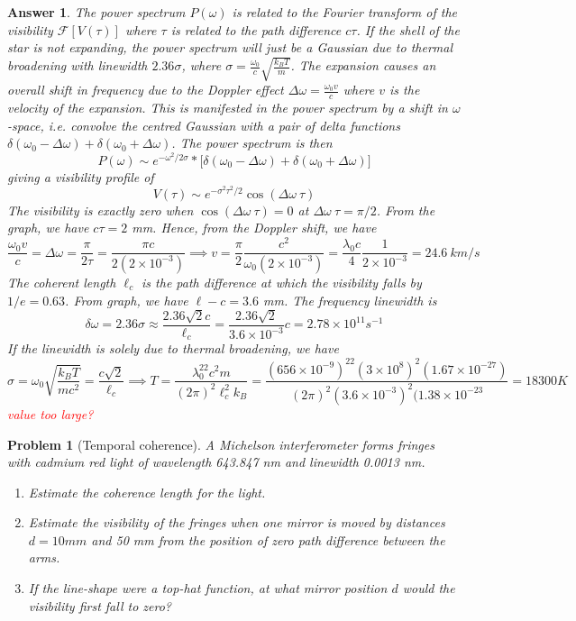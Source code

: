 \documentclass[a4paper]{article}
\newtheorem{ans}{Answer}[section]
\theoremstyle{new}
\newtheorem{qns}{Problem}[section]
\begin{document}
\begin{ans}
The power spectrum $P(\omega)$ is related to the Fourier transform of the visibility $\mathcal{F}[V(\tau)]$ where $\tau$ is related to the path difference $c\tau$. If the shell of the star is not expanding, the power spectrum will just be a Gaussian due to thermal broadening with linewidth $2.36\sigma$, where $\sigma=\frac{\omega_0}{c}\sqrt{\frac{k_BT}{m}}$. The expansion causes an overall shift in frequency due to the Doppler effect $\Delta\omega=\frac{\omega_0v}{c}$ where $v$ is the velocity of the expansion. This is manifested in the power spectrum by a shift in $\omega$-space, i.e. convolve the centred Gaussian with a pair of delta functions $\delta(\omega_0-\Delta\omega)+\delta(\omega_0+\Delta\omega)$. The power spectrum is then
$$P(\omega)\sim e^{-\omega^2/2\sigma}*\bigg[\delta(\omega_0-\Delta\omega)+\delta(\omega_0+\Delta\omega)\bigg]$$
giving a visibility profile of
$$V(\tau)\sim e^{-\sigma^2\tau^2/2}\cos(\Delta\omega~\tau)$$
The visibility is exactly zero when $\cos(\Delta\omega~\tau)=0$ at $\Delta\omega~\tau=\pi/2$. From the graph, we have $c\tau=2$ mm. Hence, from the Doppler shift, we have
$$\frac{\omega_0v}{c}=\Delta\omega=\frac{\pi}{2\tau}=\frac{\pi c}{2(2\times10^{-3})}\implies v=\frac{\pi}{2}\frac{c^2}{\omega_0(2\times10^{-3})}=\frac{\lambda_0c}{4}\frac{1}{2\times10^{-3}}=24.6~km/s$$
The coherent length $\ell_c$ is the path difference at which the visibility falls by $1/e=0.63$. From graph, we have $\ell-c=3.6$ mm. The frequency linewidth is 
$$\delta\omega=2.36\sigma\approx\frac{2.36\sqrt{2}c}{\ell_c}=\frac{2.36\sqrt{2}}{3.6\times10^{-3}}c=2.78\times10^{11}s^{-1}$$
If the linewidth is solely due to thermal broadening, we have
$$\sigma=\omega_0\sqrt{\frac{k_BT}{mc^2}}=\frac{c\sqrt{2}}{\ell_c}\implies T=\frac{\lambda_0^22c^2m}{(2\pi)^2\ell_c^2k_B}=\frac{(656\times10^{-9})^22(3\times10^8)^2(1.67\times10^{-27})}{(2\pi)^2(3.6\times10^{-3})^2(1.38\times10^{-23}}=18300 K$$
\textcolor{red}{value too large?}
\end{ans}
\newpage
\begin{qns}[Temporal coherence]
A Michelson interferometer forms fringes with cadmium red light of wavelength 643.847 nm and linewidth 0.0013 nm.
\begin{enumerate}[label=(\alph*)]
\item Estimate the coherence length for the light.
\item  Estimate the visibility of the fringes when one mirror is moved by distances $d= 10 mm$ and 50 mm from the position of zero path difference between the arms.
\item If the line-shape were a top-hat function, at what mirror position $d$ would the visibility first fall to zero?
\end{enumerate}
\end{qns}
\end{document}
